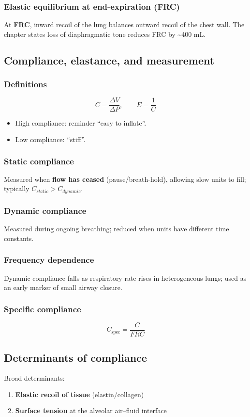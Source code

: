 \documentclass[11pt,a4paper]{article}
\begin{document}
\subsubsection{Elastic equilibrium at end-expiration (FRC)}
At \textbf{FRC}, inward recoil of the lung balances outward recoil of the chest wall. The chapter states loss of diaphragmatic tone reduces FRC by \textasciitilde 400 mL.

\subsection{Compliance, elastance, and measurement}
\subsubsection{Definitions}
\[
C = \frac{\Delta V}{\Delta P}, \qquad E = \frac{1}{C}
\]
\begin{itemize}
  \item High compliance: reminder ``easy to inflate''.
  \item Low compliance: ``stiff''.
\end{itemize}

\subsubsection{Static compliance}
Measured when \textbf{flow has ceased} (pause/breath-hold), allowing slow units to fill; typically $C_{static} > C_{dynamic}$.

\subsubsection{Dynamic compliance}
Measured during ongoing breathing; reduced when units have different time constants.

\subsubsection{Frequency dependence}
Dynamic compliance falls as respiratory rate rises in heterogeneous lungs; used as an early marker of small airway closure.

\subsubsection{Specific compliance}
\[
C_{\text{spec}} = \frac{C}{FRC}
\]

\subsection{Determinants of compliance}
Broad determinants:
\begin{enumerate}
  \item \textbf{Elastic recoil of tissue} (elastin/collagen)
  \item \textbf{Surface tension} at the alveolar air--fluid interface
\end{enumerate}
\end{document}
